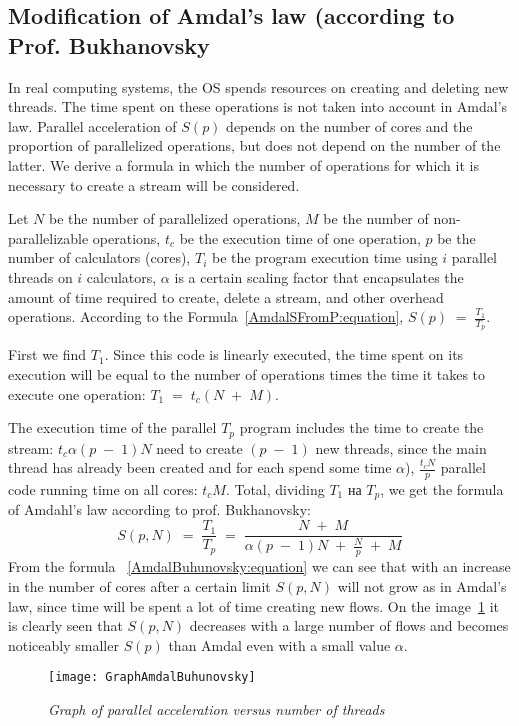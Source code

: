 { %
	\subsection{Modification of Amdal's law (according to Prof. Bukhanovsky}
	\par In real computing systems, the OS spends resources on creating and deleting new threads. The time spent on these operations is not taken into account in Amdal's law. Parallel acceleration of $ S (p) $ depends on the number of cores and the proportion of parallelized operations, but does not depend on the number of the latter. We derive a formula in which the number of operations for which it is necessary to create a stream will be considered.
	\par Let $N$ be the number of parallelized operations, $ M $ be the number of non-parallelizable operations,  $t_c$ be the execution time of one operation, $p$ be the number of calculators (cores), $T_i$ be the program execution time using $i$ parallel threads on $i$ calculators, $\alpha$ is a certain scaling factor that encapsulates the amount of time required to create, delete a stream, and other overhead operations.
According to the Formula~\eqref{AmdalSFromP:equation}, $S(p)\;=\;\frac{T_1}{T_p}$.
	\par First we find $ T_1 $. Since this code is linearly executed, the time spent on its execution will be equal to the number of operations times the time it takes to execute one operation: $T_1\;=\;t_c(N\;+\;M)$. 
	\par The execution time of the parallel $T_p$ program includes the time to create the stream: $t_c\alpha(p\;-\;1)N$ need to create $(p\;-\;1)$ new threads, since the main thread has already been created and for each spend some time $\alpha$),  $\frac {t_cN}p$ parallel code running time on all cores: $t_cM$. Total, dividing $T_1$ на $T_p$, we get the formula of Amdahl’s law according to prof. Bukhanovsky:
	\begin{equation}
		\label{AmdalBuhunovsky:equation}
		S(p,N)\;=\;\frac{T_1}{T_p}\;=\;\frac{N\;+\;M}{\alpha(p\;-\;1)N\;+\;\frac Np\;+\;M}
	\end{equation}
From the formula ~\eqref{AmdalBuhunovsky:equation} we can see that with an increase in the number of cores after a certain limit $S(p,N)$ will not grow as in Amdal’s law, since time will be spent a lot of time creating new flows. On the image~\ref{GraphAmdalBuhunovsky:image} it is clearly seen that $S(p,N)$ decreases with a large number of flows and becomes noticeably smaller $S(p)$ than Amdal even with a small value $\alpha$.
	\begin{figure}[H]
		\texttt{[image: GraphAmdalBuhunovsky]}
		\caption{\textit{Graph of parallel acceleration versus number of threads}}
		\label{GraphAmdalBuhunovsky:image}
	\end{figure}
}